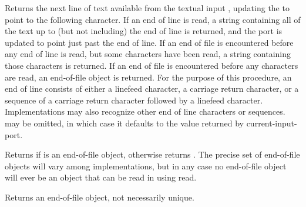 \begin{entry}{%
}

Returns the next line of text available from the textual input
, updating the  to point to the following character.
If an end of line is read, a string containing all of the text up to
(but not including) the end of line is returned, and the port is updated
to point just past the end of line. If an end of file is encountered
before any end of line is read, but some characters have been
read, a string containing those characters is returned. If an end of
file is encountered before any characters are read, an end-of-file
object is returned.  For the purpose of this procedure, an end of line
consists of either a linefeed character, a carriage return character, or a
sequence of a carriage return character followed by a linefeed character.
Implementations may also recognize other end of line characters or sequences.
 may be omitted, in which case it defaults to the value returned
by {\cf current-input-port}.

\end{entry}


\begin{entry}{%
}

Returns \schtrue{} if  is an end-of-file object, otherwise returns
\schfalse.  The precise set of end-of-file objects will vary among
implementations, but in any case no end-of-file object will ever be an object
that can be read in using {\cf read}.

\end{entry}

\begin{entry}{%
}

Returns an end-of-file object, not necessarily unique.

\end{entry}


